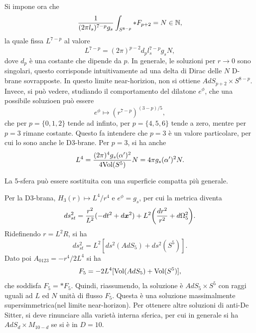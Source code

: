Si impone ora che 
\begin{equation}
    \frac{1}{(2\pi l_s)^{7 - p}g_s}\int_{S^{8 - p}}*F_{p + 2} = N \in \mathbb{N},
\end{equation}
la quale fissa $L^{7 - p}$ al valore 
\begin{equation}
    L^{7 - p} = (2\pi)^{p - 2}d_pl_s^{7 - p}g_sN,
\end{equation}
dove $d_p$ è una costante che dipende da $p$. In generale, le soluzioni per $r \to 0$ sono singolari, questo corrisponde intuitivamente ad una delta di Dirac delle $N$ D-brane sovrapposte. In questo limite near-horizion, non si ottiene $AdS_{p + 2} \times S^{8 - p}$. Invece, si può vedere, studiando il comportamento del dilatone $e^\phi$, che una possibile soluzioen può essere 
\begin{equation}
    e^\phi \mapsto (r^{7 - p})^{(3 - p)/5},
\end{equation}
che per $p = \{0,1,2\}$ tende ad infinto, per $p = \{4,5,6\}$ tende a zero, mentre per $p = 3$ rimane costante. Questo fa intendere che $p = 3$ è un valore particolare, per cui lo sono anche le D3-brane. Per $p = 3$, si ha anche 
\begin{equation}
    L^4 = \frac{(2\pi)^4g_s(\alpha')^2}{4\mathrm{Vol}(S^5)}N = 4\pi g_s(\alpha')^2N.
\end{equation}
\begin{obs}
    La 5-sfera può essere sostituita con una superficie compatta più generale.
\end{obs}
Per la D3-brana, $H_3(r) \mapsto L^4/r^4$ e $e^\phi = g_s$, per cui la metrica diventa 
\begin{equation}
    ds_{st}^2 = \frac{r^2}{L^2}(-dt^2 + d\bm{x}^2) + L^2\bigg(\frac{dr^2}{r^2} + d\Omega_5^2\bigg).
\end{equation}
Ridefinendo $r = L^2R$, si ha 
\begin{equation}
    ds_{st}^2 = L^2[ds^2(AdS_5) + ds^2(S^5)].
\end{equation}
Dato poi $A_{0123} = -r^4/2L^4$ si ha 
\begin{equation}
    F_5 = -2L^4[\mathrm{Vol}(AdS_5) + \mathrm{Vol}(S^5)],
\end{equation}
che soddisfa $F_5 = *F_5$. Quindi, riassumendo, la soluzione è $AdS_5 \times S^5$ con raggi uguali ad $L$ ed $N$ unità di flusso $F_5$. Questa è una soluzione massimalmente supersimmetrica(nel limite near-horizon). Per ottenere altre soluzioni di anti-De Sitter, si deve rinunciare alla varietà interna sferica, per cui in generale si ha $AdS_d \times M_{10 - d}$ se si è in $D = 10$.

